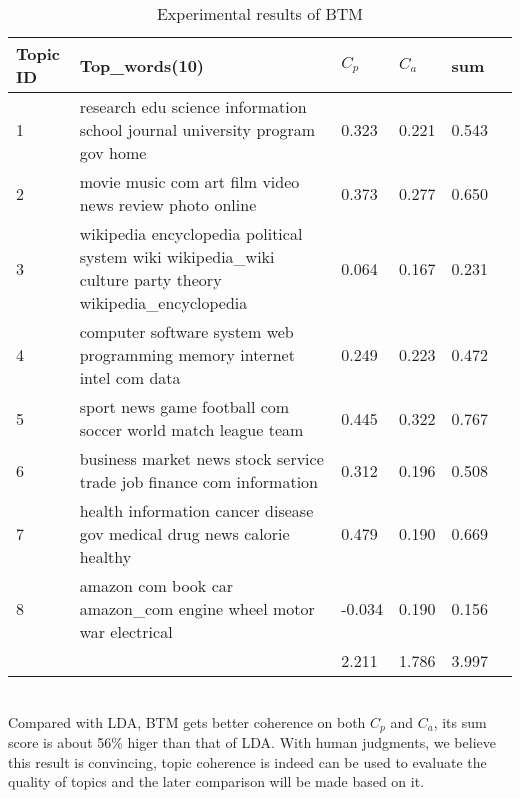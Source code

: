 \begin{table}[!htbp]
    \centering
    \hspace{0.5cm}
    \begin{tabular}{|p{45pt}|p{210pt}|p{30pt}|p{30pt}|p{30pt}|p{30pt}|}
        \hline
        Topic ID & Top\_words(10) & $C_p$ & $C_a$ & sum\\ \hline
        1 & research edu science information school journal university program gov home & 0.323 & 0.221 & 0.543\\\hline
        2 & movie music com art film video news review photo online & 0.373 & 0.277 & 0.650\\\hline
        3 & wikipedia encyclopedia political system wiki wikipedia\_wiki culture party theory wikipedia\_encyclopedia & 0.064 & 0.167 & 0.231\\\hline
        4 & computer software system web programming memory internet intel com data & 0.249 & 0.223 & 0.472\\\hline
        5 & sport news game football com soccer world match league team & 0.445 & 0.322 & 0.767\\\hline
        6 & business market news stock service trade job finance com information & 0.312 & 0.196 & 0.508\\\hline
        7 & health information cancer disease gov medical drug news calorie healthy & 0.479 & 0.190 & 0.669\\\hline
        8 & amazon com book car amazon\_com engine wheel motor war electrical & -0.034 & 0.190 & 0.156\\\hline
        & & 2.211 & 1.786 & 3.997\\\hline
    \end{tabular}
    \caption{Experimental results of BTM}
    \label{tab:BTM1}
\end{table}
\\Compared with LDA, BTM gets better coherence on both $C_p$ and $C_a$, its sum score is about 56\% higer than that of LDA. With human judgments, we believe this result is convincing, topic coherence is indeed can be used to evaluate the quality of topics and the later comparison will be made based on it.

